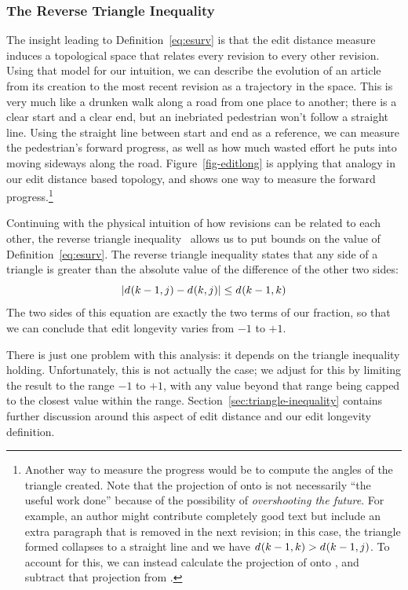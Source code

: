 \subsubsection{The Reverse Triangle Inequality}

The insight leading to Definition~\ref{eq:esurv} is that the edit distance
measure induces a topological space that relates every revision to
every other revision.
Using that model for our intuition, we can describe the evolution of
an article from its creation to the most recent revision as a trajectory
in the space.
This is very much like a drunken walk along a road from one place to another;
there is a clear start and a clear end, but an inebriated
pedestrian won't follow a straight line.
Using the straight line between start and end as a reference,
we can measure the pedestrian's forward progress, as well as
how much wasted effort he puts into moving sideways along the road.
Figure~\ref{fig-editlong} is applying that analogy in our
edit distance based topology, and shows one way to measure
the forward progress.\footnote{Another way to measure the progress would
  be to compute the angles of the triangle created.
  Note that the projection of  onto  is not
  necessarily ``the useful work done'' because of the possibility of
  \textit{overshooting the future}.
  For example, an author might contribute completely good text but include
  an extra paragraph that is removed in the next revision; in this case,
  the triangle formed collapses to a straight line and we have
  $d_{}(k-1,k) > d_{}(k-1,j)$.
  To account for this, we can instead calculate the projection of
   onto , and subtract that projection
  from .
}

Continuing with the physical intuition of how revisions can be
related to each other, the reverse triangle
inequality~\cite{wiki:TriangleInequality} allows us to put bounds
on the value of Definition~\ref{eq:esurv}.
The reverse triangle inequality states that any side of
a triangle is greater than the absolute value of the difference
of the other two sides:
\begin{equation}
| d_{}(k-1,j) - d_{}(k,j) | \le d_{}(k-1,k)
\end{equation}
The two sides of this equation are exactly the two terms
of our fraction, so that we can conclude that edit longevity
varies from $-1$ to $+1$.

There is just one problem with this analysis: it depends on
the triangle inequality holding.
Unfortunately, this is not actually the case; we adjust for
this by limiting the result to the range $-1$ to $+1$,
with any value beyond that range being capped to the closest
value within the range.
Section~\ref{sec:triangle-inequality} contains further discussion
around this aspect of edit distance and our edit longevity
definition.

